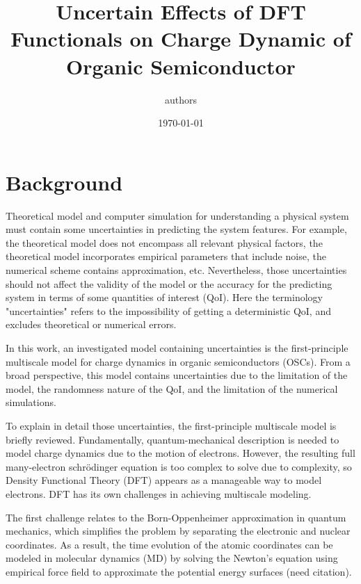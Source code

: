 \documentclass[letterpaper,12pt]{article}
\begin{document}
\linenumbers
\title{Uncertain Effects of DFT Functionals on Charge Dynamic of Organic Semiconductor }
\author{authors}
\date{\today}
\maketitle
\begin{abstract}

\end{abstract}

\section{Background}

Theoretical model and computer simulation for understanding a physical system must contain some uncertainties in predicting the system features. 
For example, the theoretical model does not encompass all relevant physical factors, the theoretical model incorporates empirical parameters that include noise, the numerical scheme contains approximation, etc.
Nevertheless, those uncertainties should not affect the validity of the model or the accuracy for the predicting system in terms of some quantities of interest (QoI). 
Here the terminology "uncertainties" refers to the impossibility of getting a deterministic QoI, and excludes theoretical or numerical errors. 

In this work, an investigated model containing uncertainties is the first-principle multiscale model for charge dynamics in organic semiconductors (OSCs).
From a broad perspective, this model contains uncertainties due to the limitation of the model, the randomness nature of the QoI, and the limitation of the numerical simulations.

To explain in detail those uncertainties, the first-principle multiscale model is briefly reviewed. 
Fundamentally, quantum-mechanical description is needed to model charge dynamics due to the motion of electrons. However, the resulting full many-electron schr\"{o}dinger equation is too complex to solve due to complexity, so Density Functional Theory (DFT) appears as a manageable way to model electrons.
DFT has its own challenges in achieving multiscale modeling.

The first challenge relates to the Born-Oppenheimer approximation in quantum
mechanics, which simplifies the problem by separating the electronic and nuclear
coordinates. As a result, the time evolution of the atomic coordinates can be modeled in molecular dynamics (MD) by solving the Newton's equation using empirical force field to approximate the potential energy surfaces (need citation). 
\end{document}
